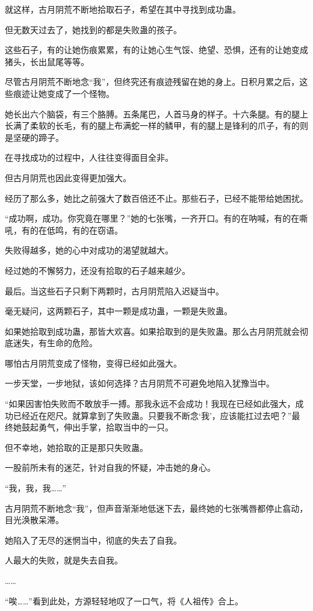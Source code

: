 \begin{this_body}
就这样，古月阴荒不断地拾取石子，希望在其中寻找到成功蛊。

但无数天过去了，她找到的都是失败蛊的孩子。

这些石子，有的让她伤痕累累，有的让她心生气馁、绝望、恐惧，还有的让她变成猪头，长出鼠尾等等。

尽管古月阴荒不断地念“我”，但终究还有痕迹残留在她的身上。日积月累之后，这些痕迹让她变成了一个怪物。

她长出六个脑袋，有三个胳膊。五条尾巴，人首马身的样子。十六条腿。有的腿上长满了柔软的长毛，有的腿上布满蛇一样的鳞甲，有的腿上是锋利的爪子，有的则是坚硬的蹄子。

在寻找成功的过程中，人往往变得面目全非。

但古月阴荒也因此变得更加强大。

经历了那么多，她比之前强大了数百倍还不止。那些石子，已经不能带给她困扰。

“成功啊，成功。你究竟在哪里？”她的七张嘴，一齐开口。有的在呐喊，有的在嘶吼，有的在低鸣，有的在窃语。

失败得越多，她的心中对成功的渴望就越大。

经过她的不懈努力，还没有拾取的石子越来越少。

最后。当这些石子只剩下两颗时，古月阴荒陷入迟疑当中。

毫无疑问，这两颗石子，其中一颗是成功蛊，一颗是失败蛊。

如果她拾取到成功蛊，那皆大欢喜。如果拾取到的是失败蛊。那么古月阴荒就会彻底迷失，有生命的危险。

哪怕古月阴荒变成了怪物，变得已经如此强大。

一步天堂，一步地狱，该如何选择？古月阴荒不可避免地陷入犹豫当中。

“如果因害怕失败而不敢放手一搏。那我永远不会成功！我现在已经如此强大，成功已经近在咫尺。就算拿到了失败蛊。只要我不断念‘我’，应该能扛过去吧？”最终她鼓起勇气，伸出手掌，拾取当中的一只。

但不幸地，她拾取的正是那只失败蛊。

一股前所未有的迷茫，针对自我的怀疑，冲击她的身心。

“我，我，我……”

古月阴荒不断地念“我”，但声音渐渐地低迷下去，最终她的七张嘴唇都停止翕动，目光涣散呆滞。

她陷入了无尽的迷惘当中，彻底的失去了自我。

人最大的失败，就是失去自我。

……

“唉……”看到此处，方源轻轻地叹了一口气，将《人祖传》合上。


\end{this_body}

